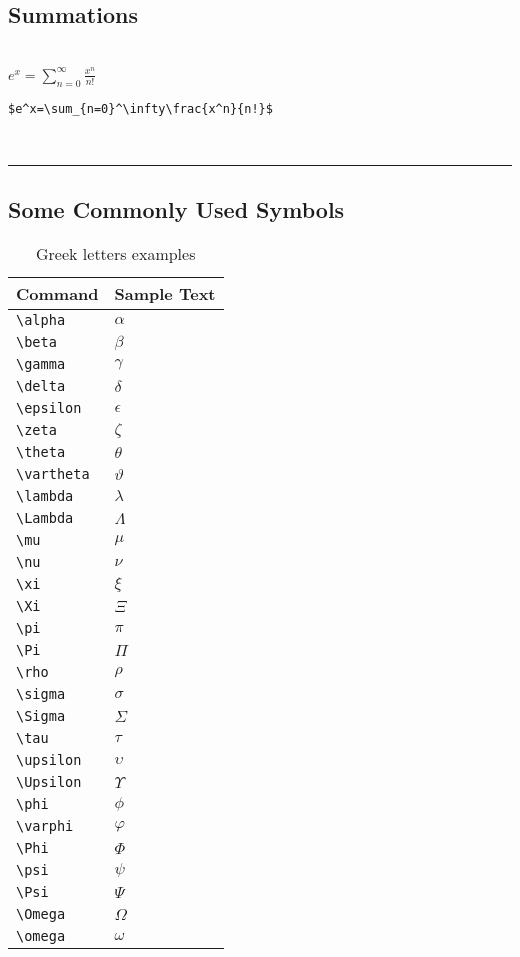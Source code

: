 \documentclass[a4paper,12pt,titlepage]{article}
\begin{document}
\subsection{Summations}
~\\
$e^x=\sum_{n=0}^\infty\frac{x^n}{n!}$
\\
\begin{lstlisting}  
$e^x=\sum_{n=0}^\infty\frac{x^n}{n!}$
\end{lstlisting}  
~\\
\rule{\linewidth}{0.1mm}


\subsection{Some Commonly Used Symbols}
\begin{table}[H]
\center
	\begin{tabular}{l|l}
	\hline
	\textbf{Command} & \textbf{Sample Text} \\
	\hline
	\hline
	
	\verb|\alpha| & $\alpha$ \\
	\verb|\beta| & $\beta$ \\
	\verb|\gamma| & $\gamma$ \\
	\verb|\delta| & $\delta$ \\
	\verb|\epsilon| & $\epsilon$  \\
	\verb|\zeta| &  $\zeta$\\
	\verb|\theta| &  $\theta$\\
	\verb|\vartheta| & $\vartheta$\\
	\verb|\lambda| &  $\lambda$\\
	\verb|\Lambda| & $\Lambda$\\
	\verb|\mu| & $\mu$\\
	\verb|\nu| & $\nu$\\
	\verb|\xi| & $\xi$\\
	\verb|\Xi| & $\Xi$\\
	\verb|\pi| & $\pi$\\
	\verb|\Pi | & $\Pi$  \\
	\verb|\rho | & $\rho$  \\
	\verb|\sigma | & $\sigma$  \\
	\verb|\Sigma | & $\Sigma$  \\
	\verb|\tau | & $\tau$  \\
	\verb|\upsilon | & $\upsilon$  \\
	\verb|\Upsilon | & $\Upsilon$  \\
	\verb|\phi | & $\phi$  \\
	\verb|\varphi | & $\varphi$  \\
	\verb|\Phi | & $\Phi$  \\
	\verb|\psi | & $\psi$  \\
	\verb|\Psi | & $\Psi$  \\
	\verb|\Omega | & $\Omega$  \\
	\verb|\omega | & $\omega$  \\
	\end{tabular}
	\caption{Greek letters examples}\label{sec:greek}
\end{table}
\end{document}
